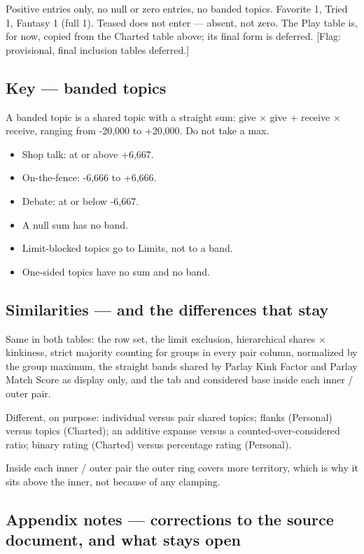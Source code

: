 Positive entries only, no null or zero entries, no banded topics.
Favorite 1, Tried 1, Fantasy 1 (full 1). Teased does not enter ---
absent, not zero. The Play table is, for now, copied from the Charted
table above; its final form is deferred. {[}Flag: provisional, final
inclusion tables deferred.{]}

\subsection{Key --- banded topics}\label{key-banded-topics}

A banded topic is a shared topic with a straight sum: give $\times$ give +
receive $\times$ receive, ranging from -20,000 to +20,000. Do not take a max.

\begin{itemize}
\tightlist
\item
  Shop talk: at or above +6,667.
\item
  On-the-fence: -6,666 to +6,666.
\item
  Debate: at or below -6,667.
\item
  A null sum has no band.
\item
  Limit-blocked topics go to Limits, not to a band.
\item
  One-sided topics have no sum and no band.
\end{itemize}

\subsection{Similarities --- and the differences that
stay}\label{similarities-and-the-differences-that-stay}

Same in both tables: the row set, the limit exclusion, hierarchical
shares $\times$ kinkiness, strict majority counting for groups in every pair
column, normalized by the group maximum, the straight bands shared by
Parlay Kink Factor and Parlay Match Score as display only, and the tab
and considered base inside each inner / outer pair.

Different, on purpose: individual versus pair shared topics; flanks
(Personal) versus topics (Charted); an additive expanse versus a
counted-over-considered ratio; binary rating (Charted) versus percentage
rating (Personal).

Inside each inner / outer pair the outer ring covers more territory,
which is why it sits above the inner, not because of any clamping.

\subsection{Appendix notes --- corrections to the source document, and
what stays
open}\label{appendix-notes-corrections-to-the-source-document-and-what-stays-open}

